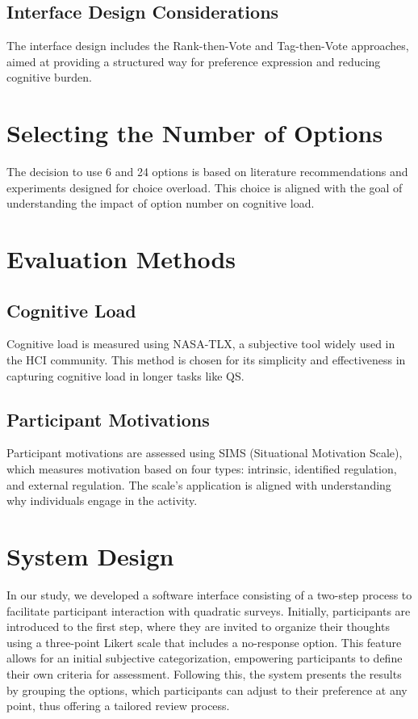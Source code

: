 \subsection{Interface Design Considerations}
The interface design includes the Rank-then-Vote and Tag-then-Vote approaches, aimed at providing a structured way for preference expression and reducing cognitive burden.

\section{Selecting the Number of Options}
The decision to use 6 and 24 options is based on literature recommendations and experiments designed for choice overload. This choice is aligned with the goal of understanding the impact of option number on cognitive load.

\section{Evaluation Methods}
\subsection{Cognitive Load}
Cognitive load is measured using NASA-TLX, a subjective tool widely used in the HCI community. This method is chosen for its simplicity and effectiveness in capturing cognitive load in longer tasks like QS.

\subsection{Participant Motivations}
Participant motivations are assessed using SIMS (Situational Motivation Scale), which measures motivation based on four types: intrinsic, identified regulation, and external regulation. The scale's application is aligned with understanding why individuals engage in the activity.


\section{System Design}
In our study, we developed a software interface consisting of a two-step process to facilitate participant interaction with quadratic surveys. Initially, participants are introduced to the first step, where they are invited to organize their thoughts using a three-point Likert scale that includes a no-response option. This feature allows for an initial subjective categorization, empowering participants to define their own criteria for assessment. Following this, the system presents the results by grouping the options, which participants can adjust to their preference at any point, thus offering a tailored review process.

